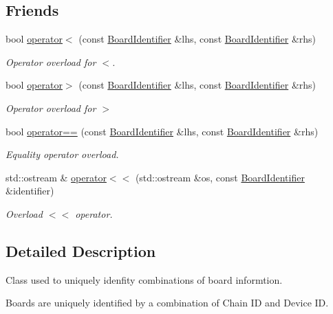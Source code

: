\subsection*{Friends}
\begin{DoxyCompactItemize}
\item 
bool \hyperlink{class_board_identifier_a952ba26774a854af0abe8f188ddda22b}{operator$<$} (const \hyperlink{class_board_identifier}{Board\+Identifier} \&lhs, const \hyperlink{class_board_identifier}{Board\+Identifier} \&rhs)
\begin{DoxyCompactList}\small\item\em Operator overload for $<$. \end{DoxyCompactList}\item 
bool \hyperlink{class_board_identifier_a8be3f9aae87b9813d881a3c97c943d0d}{operator$>$} (const \hyperlink{class_board_identifier}{Board\+Identifier} \&lhs, const \hyperlink{class_board_identifier}{Board\+Identifier} \&rhs)
\begin{DoxyCompactList}\small\item\em Operator overload for $>$ \end{DoxyCompactList}\item 
bool \hyperlink{class_board_identifier_a7e5f6b9a11fbed47acc7aeafab856eed}{operator==} (const \hyperlink{class_board_identifier}{Board\+Identifier} \&lhs, const \hyperlink{class_board_identifier}{Board\+Identifier} \&rhs)
\begin{DoxyCompactList}\small\item\em Equality operator overload. \end{DoxyCompactList}\item 
std\+::ostream \& \hyperlink{class_board_identifier_a7c82c259188e9ed8c552911db5c4f454}{operator$<$$<$} (std\+::ostream \&os, const \hyperlink{class_board_identifier}{Board\+Identifier} \&identifier)
\begin{DoxyCompactList}\small\item\em Overload $<$$<$ operator. \end{DoxyCompactList}\end{DoxyCompactItemize}


\subsection{Detailed Description}
Class used to uniquely idenfity combinations of board informtion. 

Boards are uniquely identified by a combination of Chain ID and Device ID.

